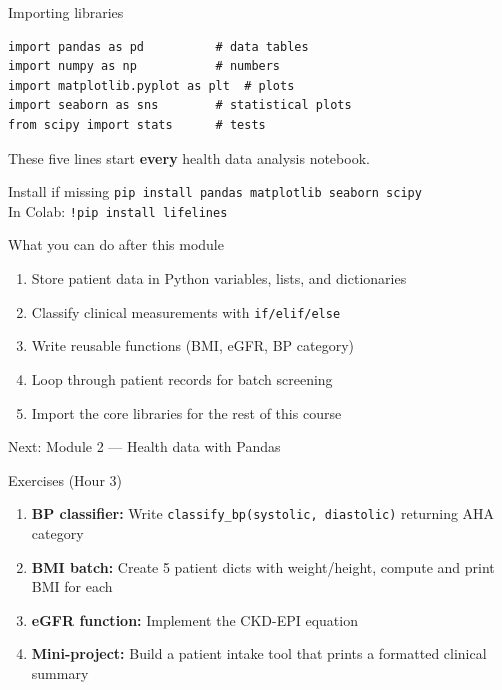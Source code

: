 \documentclass[aspectratio=169,11pt]{beamer}
\begin{document}
\begin{frame}[fragile]{Importing libraries}
\begin{verbatim}
import pandas as pd          # data tables
import numpy as np           # numbers
import matplotlib.pyplot as plt  # plots
import seaborn as sns        # statistical plots
from scipy import stats      # tests
\end{verbatim}

\vspace{6pt}
These five lines start \textbf{every} health data analysis notebook.

\vspace{6pt}
\begin{exampleblock}{Install if missing}
\texttt{pip install pandas matplotlib seaborn scipy}\\
In Colab: \texttt{!pip install lifelines}
\end{exampleblock}
\end{frame}

\begin{frame}{What you can do after this module}
\begin{enumerate}
  \item Store patient data in Python variables, lists, and dictionaries
  \item Classify clinical measurements with \texttt{if/elif/else}
  \item Write reusable functions (BMI, eGFR, BP category)
  \item Loop through patient records for batch screening
  \item Import the core libraries for the rest of this course
\end{enumerate}

\vspace{12pt}
\centering
\Large \alert{Next: Module 2 --- Health data with Pandas}
\end{frame}

\begin{frame}{Exercises (Hour 3)}
\begin{enumerate}
  \item \textbf{BP classifier:} Write \texttt{classify\_bp(systolic, diastolic)} returning AHA category
  \item \textbf{BMI batch:} Create 5 patient dicts with weight/height, compute and print BMI for each
  \item \textbf{eGFR function:} Implement the CKD-EPI equation
  \item \textbf{Mini-project:} Build a patient intake tool that prints a formatted clinical summary
\end{enumerate}
\end{frame}
\end{document}
